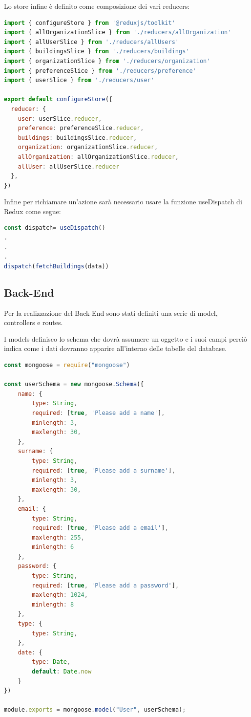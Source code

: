\documentclass{report}
\begin{document}
Lo store infine è definito come composizione dei vari reducers: 
\begin{lstlisting}[language=JavaScript]
import { configureStore } from '@reduxjs/toolkit'
import { allOrganizationSlice } from './reducers/allOrganization'
import { allUserSlice } from './reducers/allUsers'
import { buildingsSlice } from './reducers/buildings'
import { organizationSlice } from './reducers/organization'
import { preferenceSlice } from './reducers/preference'
import { userSlice } from './reducers/user'

export default configureStore({
  reducer: {
    user: userSlice.reducer,
    preference: preferenceSlice.reducer,
    buildings: buildingsSlice.reducer,
    organization: organizationSlice.reducer,
    allOrganization: allOrganizationSlice.reducer,
    allUser: allUserSlice.reducer
  },
})
\end{lstlisting}
Infine per richiamare un'azione sarà necessario usare la funzione useDispatch di Redux come segue:
\begin{lstlisting}[language=JavaScript]
const dispatch= useDispatch()
.
.
.
dispatch(fetchBuildings(data))
\end{lstlisting}

\subsection {Back-End}
Per la realizzazione del Back-End sono stati definiti una serie di model, controllers e routes. 
\par I models definisco lo schema che dovrà assumere un oggetto e i suoi campi perciò indica come i dati dovranno apparire all'interno delle tabelle del database.

\begin{lstlisting}[language=JavaScript]
const mongoose = require("mongoose")

const userSchema = new mongoose.Schema({
    name: {
        type: String,
        required: [true, 'Please add a name'],
        minlength: 3,
        maxlength: 30,
    },
    surname: {
        type: String,
        required: [true, 'Please add a surname'],
        minlength: 3,
        maxlength: 30,
    },
    email: {
        type: String,
        required: [true, 'Please add a email'],
        maxlength: 255,
        minlength: 6
    },
    password: {
        type: String,
        required: [true, 'Please add a password'],
        maxlength: 1024,
        minlength: 8
    },
    type: {
        type: String,
    },
    date: {
        type: Date,
        default: Date.now
    }
})

module.exports = mongoose.model("User", userSchema);
\end{lstlisting}
\end{document}
